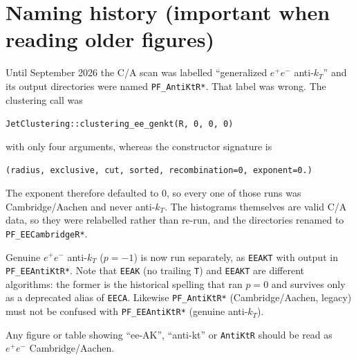 \documentclass[11pt,a4paper]{article}
\newcommand{\ee}{$e^{+}e^{-}$}
\begin{document}
\section*{Naming history (important when reading older figures)}

Until September 2026 the C/A scan was labelled ``generalized \ee{} anti-$k_T$''
and its output directories were named \texttt{PF\_AntiKtR*}. That label was
wrong. The clustering call was
\begin{center}
\texttt{JetClustering::clustering\_ee\_genkt(R, 0, 0, 0)}
\end{center}
with only four arguments, whereas the constructor signature is
\begin{center}
\texttt{(radius, exclusive, cut, sorted, recombination=0, exponent=0.)}
\end{center}
The exponent therefore defaulted to $0$, so every one of those runs was
Cambridge/Aachen and never anti-$k_T$. The histograms themselves are valid C/A
data, so they were relabelled rather than re-run, and the directories renamed to
\texttt{PF\_EECambridgeR*}.

Genuine \ee{} anti-$k_T$ ($p=-1$) is now run separately, as \texttt{EEAKT} with output
in \texttt{PF\_EEAntiKtR*}. Note that \texttt{EEAK} (no trailing \texttt{T}) and
\texttt{EEAKT} are different algorithms: the former is the historical spelling that ran
$p=0$ and survives only as a deprecated alias of \texttt{EECA}. Likewise
\texttt{PF\_AntiKtR*} (Cambridge/Aachen, legacy) must not be confused with
\texttt{PF\_EEAntiKtR*} (genuine anti-$k_T$).

Any figure or table showing ``ee-AK'', ``anti-kt'' or \texttt{AntiKtR} should be
read as \ee{} Cambridge/Aachen.
\end{document}
